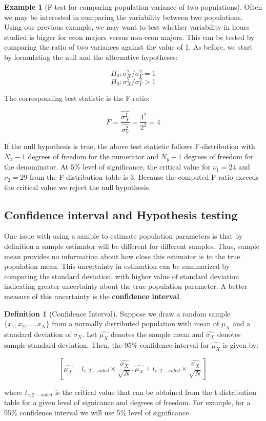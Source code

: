 \documentclass[
]{book}
\theoremstyle{definition}
\newtheorem{definition}{Definition}[chapter]
\theoremstyle{definition}
\newtheorem{example}{Example}[chapter]
\theoremstyle{definition}
\theoremstyle{definition}
\theoremstyle{remark}
\begin{document}
\begin{example}[F-test for comparing population variance of two populations]
\protect\hypertarget{exm:unnamed-chunk-51}{}\label{exm:unnamed-chunk-51}Often we may be interested in comparing the variability between two populations. Using our previous example, we may want to test whether variability in hours studied is bigger for econ majors versus non-econ majors. This can be tested by comparing the ratio of two variances against the value of 1. As before, we start by formulating the null and the alternative hypotheses:

\[H_0: \sigma^2_X/\sigma^2_Y = 1\]
\[H_0: \sigma^2_X/\sigma^2_Y > 1\]

The corresponding test statistic is the F-ratio:

\[F = \frac{\hat{\sigma^2_X}}{\hat{\sigma^2_Y}}=\frac{4^2}{2^2}=4\]

If the null hypothesis is true, the above test statistic follows F-distribution with \(N_x-1\) degrees of freedom for the numerator and \(N_y-1\) degrees of freedom for the denominator. At 5\% level of significance, the critical value for \(\nu_1=24\) and \(\nu_2=29\) from the F-distribution table is 3. Because the computed F-ratio exceeds the critical value we reject the null hypothesis.
\end{example}

\hypertarget{confidence-interval-and-hypothesis-testing}{%
\subsection{Confidence interval and Hypothesis testing}\label{confidence-interval-and-hypothesis-testing}}

One issue with using a sample to estimate population parameters is that by definition a sample estimator will be different for different samples. Thus, sample mean provides no information about how close this estimator is to the true population mean. This uncertainty in estimation can be summarized by computing the standard deviation, with higher value of standard deviation indicating greater uncertainty about the true population parameter. A better measure of this uncertainty is the \textbf{confidence interval}.

\begin{definition}[Confidence Interval]
\protect\hypertarget{def:unnamed-chunk-52}{}\label{def:unnamed-chunk-52}Suppose we draw a random sample \(\{x_1, x_2,...,x_N\}\) from a normally distributed population with mean of \(\mu_X\) and a standard deviation of \(\sigma_X\). Let \(\hat{\mu_X}\) denotes the sample mean and \(\hat{\sigma_X}\) denotes sample standard deviation. Then, the 95\% confidence interval for \(\hat{\mu_X}\) is given by:

\[\left[\hat{\mu_X}-t_{c,2-sided} \times \frac{\hat{\sigma_X}}{\sqrt{N}},\hat{\mu_X}+t_{c,2-sided} \times \frac{\hat{\sigma_X}}{\sqrt{N}} \right]\]

where \(t_{c,2-sided}\) is the critical value that can be obtained from the t-distribution table for a given level of signicance and degrees of freedom. For example, for a 95\% confidence interval we will use 5\% level of significance.
\end{definition}
\end{document}
